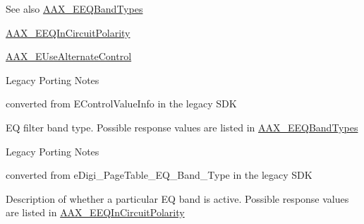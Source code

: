 \begin{DoxySeeAlso}{See also}
\hyperlink{a00206_a9ec6da28e827496514bd15d6f2b26d95}{A\+A\+X\+\_\+\+E\+E\+Q\+Band\+Types} 

\hyperlink{a00206_ab5bda96f09874705e9b800d1b1495b48}{A\+A\+X\+\_\+\+E\+E\+Q\+In\+Circuit\+Polarity} 

\hyperlink{a00206_abbcc8b4e8207262a5dd9e32047a51a29}{A\+A\+X\+\_\+\+E\+Use\+Alternate\+Control}
\end{DoxySeeAlso}
\begin{DoxyRefDesc}{Legacy Porting Notes}
\item[\hyperlink{a00384__porting_notes000011}{Legacy Porting Notes}]converted from {\ttfamily E\+Control\+Value\+Info} in the legacy S\+D\+K \end{DoxyRefDesc}
\begin{Desc}
\item[Enumerator]\par
\begin{description}
\item[{\em 
\hypertarget{a00206_aa169208a2ce713fa021e20deb2eaf608a99ca84cc3dae0f125082d36893a12bcd}{}A\+A\+X\+\_\+e\+Page\+Table\+\_\+\+E\+Q\+\_\+\+Band\+\_\+\+Type\label{a00206_aa169208a2ce713fa021e20deb2eaf608a99ca84cc3dae0f125082d36893a12bcd}
}]E\+Q filter band type. Possible response values are listed in \hyperlink{a00206_a9ec6da28e827496514bd15d6f2b26d95}{A\+A\+X\+\_\+\+E\+E\+Q\+Band\+Types}

\begin{DoxyRefDesc}{Legacy Porting Notes}
\item[\hyperlink{a00384__porting_notes000024}{Legacy Porting Notes}]converted from {\ttfamily e\+Digi\+\_\+\+Page\+Table\+\_\+\+E\+Q\+\_\+\+Band\+\_\+\+Type} in the legacy S\+D\+K\end{DoxyRefDesc}
\item[{\em 
\hypertarget{a00206_aa169208a2ce713fa021e20deb2eaf608ac5a06a293b7706191d3371813c47e999}{}A\+A\+X\+\_\+e\+Page\+Table\+\_\+\+E\+Q\+\_\+\+In\+Circuit\+Polarity\label{a00206_aa169208a2ce713fa021e20deb2eaf608ac5a06a293b7706191d3371813c47e999}
}]Description of whether a particular E\+Q band is active. Possible response values are listed in \hyperlink{a00206_ab5bda96f09874705e9b800d1b1495b48}{A\+A\+X\+\_\+\+E\+E\+Q\+In\+Circuit\+Polarity}


\end{description}
\end{Desc}
